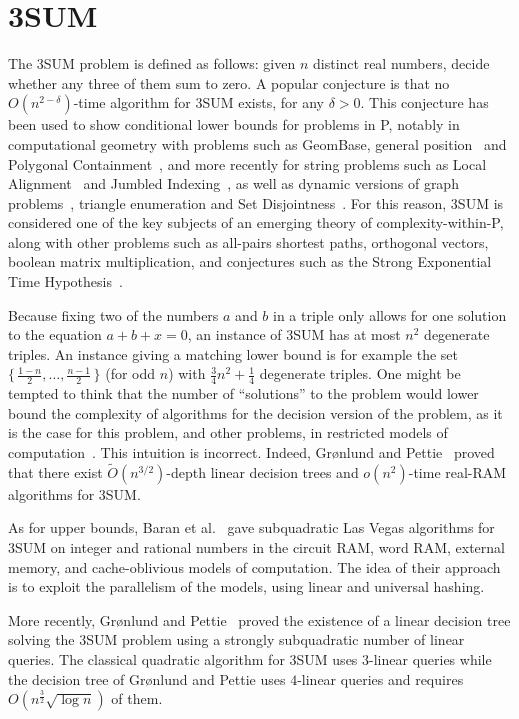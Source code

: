 \chapter{3SUM}

The 3SUM problem is defined as follows: given $n$ distinct real numbers, decide
whether any three of them sum to zero.
%
A popular conjecture is that no $O(n^{2-\delta})$-time algorithm for 3SUM
exists, for any $\delta > 0$. This conjecture has been used to show conditional
lower bounds for problems in P, notably in computational geometry with problems
such as
GeomBase, general position~\cite{GO95}
and
Polygonal Containment~\cite{BH01},
and more recently for string problems such as
Local Alignment~\cite{AVW14}
and
Jumbled Indexing~\cite{ACLL14},
as well as
dynamic versions of graph problems~\cite{P10,AV14},
triangle enumeration and Set Disjointness~\cite{KPP16}.
%
For this reason, 3SUM is considered one of the key subjects of an
emerging theory of complexity-within-P, along with other problems such as
all-pairs shortest paths,
orthogonal vectors,
boolean matrix multiplication,
and conjectures such as
the Strong Exponential Time Hypothesis~\cite{AVY15,HKNS15,CGIMPS16}.

Because fixing two of the numbers $a$ and $b$ in a triple only allows for one
solution to the equation $a + b + x = 0$, an instance of 3SUM has at most
$n^2$ degenerate triples. An instance giving a matching lower bound is for
example the set $\{\,\frac{1-n}{2},\ldots,\frac{n-1}{2}\,\}$ (for odd $n$)
with $\frac{3}{4} n^2 + \frac 14$ degenerate triples.
%
One might be tempted to think that the number of ``solutions'' to the problem
would lower bound the complexity of algorithms for the decision version of the
problem, as it is the case for this problem, and other problems, in restricted
models of computation~\cite{Er96,Er99a}.
%
This intuition is incorrect.
%
Indeed, Gr\o nlund and Pettie~\cite{GP18} proved that there exist
$\tilde{O}(n^{3/2})$-depth linear decision trees and $o(n^2)$-time real-RAM
algorithms for 3SUM\@.

As for upper bounds, Baran et al.~\cite{BDP08} gave subquadratic Las Vegas
algorithms for 3SUM on integer and
rational numbers in the circuit RAM, word RAM, external memory, and
cache-oblivious models of computation. The idea of their approach is to exploit
the parallelism of the models, using linear and universal hashing.


More recently, Gr{\o}nlund and Pettie~\cite{GP18} proved the existence of a linear decision tree
solving the 3SUM problem using a strongly subquadratic number of linear queries.
The classical quadratic algorithm for 3SUM uses \(3\)-linear queries
while the decision tree of Gr{\o}nlund and Pettie uses \(4\)-linear queries and
requires $O(n^{\frac{3}{2}} \sqrt{\log n})$ of them.

